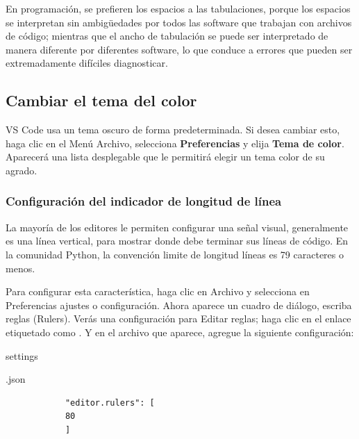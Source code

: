 \begin{minipage}[t]{0.90\textwidth} 
	{\scriptsize
		En programación, se prefieren los espacios a las tabulaciones, porque los espacios se interpretan
		sin ambigüedades por todos las software que trabajan con archivos de código; mientras que el ancho de tabulación
		se puede ser interpretado	de manera diferente por diferentes software, lo que conduce a errores que pueden ser extremadamente difíciles diagnosticar.}
\end{minipage}
\vspace{0.2cm}


\subsection{Cambiar el tema del color}

VS Code usa un tema oscuro de forma predeterminada. Si desea cambiar esto, haga clic en el Menú Archivo,  selecciona {\bf{Preferencias}}  y elija {\bf {Tema de color}}. Aparecerá una lista desplegable que le permitirá elegir un tema color de su agrado.

\subsubsection{Configuración del indicador de longitud de línea}\label{llongitud}

La mayoría de los editores le permiten configurar una señal visual, generalmente es una línea vertical, para mostrar
donde debe terminar sus líneas de código. En la comunidad Python, la convención limite de longitud líneas es 79 caracteres o menos. 

Para configurar esta característica, haga clic en Archivo y selecciona en Preferencias ajustes o configuración. Ahora aparece un cuadro de diálogo, escriba reglas (Rulers). Verás una configuración para Editar reglas;  haga clic en el enlace etiquetado como {}. Y en el archivo que aparece, agregue la siguiente configuración:\\

{\ttfamily\scriptsize\scriptsize 
	\hspace{-2.1cm}	settings
	
	\hspace{-1.5cm}.json \vspace{-0.7cm}	
	{\color{black} 	
		\begin{verbatim}
			"editor.rulers": [
			80
			]		
		\end{verbatim}
}}


